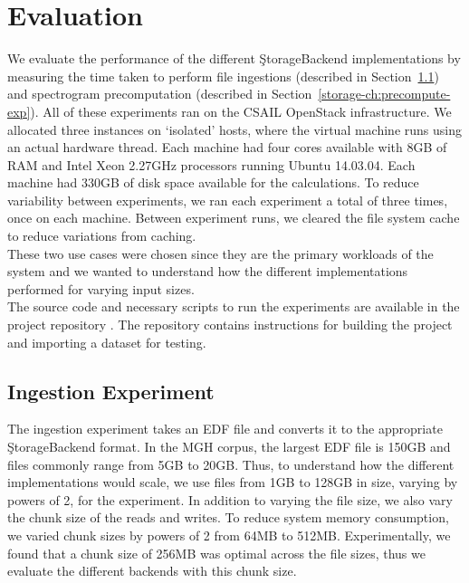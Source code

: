 \section{Evaluation}\label{storage-ch:evaluation}

We evaluate the performance of the different \c{StorageBackend} implementations
by measuring the time taken to perform file ingestions (described in
Section~\ref{storage-ch:ingestion-exp}) and spectrogram precomputation
(described in Section~\ref{storage-ch:precompute-exp}). All of these
experiments ran on the CSAIL OpenStack infrastructure. We allocated three
instances on `isolated' hosts, where the virtual machine runs using an actual
hardware thread. Each machine had four cores available with 8GB of RAM and
Intel Xeon 2.27GHz processors running Ubuntu 14.03.04. Each machine had 330GB
of disk space available for the calculations. To reduce variability between
experiments, we ran each experiment a total of three times, once on each
machine. Between experiment runs, we cleared the file system cache to reduce
variations from caching. \\

These two use cases were chosen since they are the primary workloads of the
system and we wanted to understand how the different implementations performed
for varying input sizes.\\

The source code and necessary scripts to run the experiments are available
in the project repository \cite{eeg-toolkit}. The repository contains
instructions for building the project and importing a dataset for testing.

\subsection{Ingestion Experiment}\label{storage-ch:ingestion-exp}

The ingestion experiment takes an EDF file and converts it to the appropriate
\c{StorageBackend} format. In the MGH corpus, the largest EDF file is 150GB and
files commonly range from 5GB to 20GB. Thus, to understand how the different
implementations would scale, we use files from 1GB to 128GB in size, varying by
powers of 2, for the experiment. In addition to varying the file size, we also
vary the chunk size of the reads and writes. To reduce system memory
consumption, we varied chunk sizes by powers of 2 from 64MB to 512MB.
Experimentally, we found that a chunk size of 256MB was optimal across the file
sizes, thus we evaluate the different backends with this chunk size. \\


